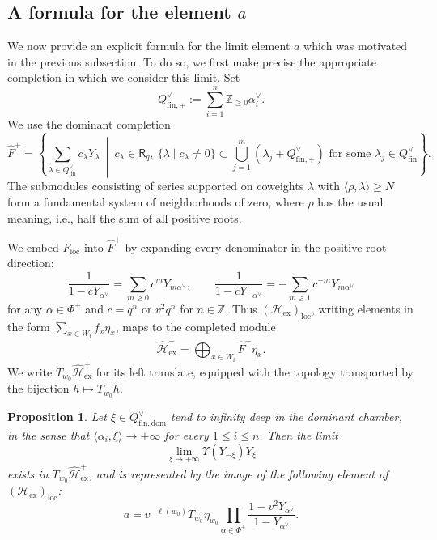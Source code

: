 \documentclass{amsart}
\newcommand{\Ring}{\mathsf{R}}
\newtheorem{Prop}[Thm]{Proposition}
\theoremstyle{definition}
\numberwithin{equation}{section}
\begin{document}
\subsection{A formula for the element $a$}\label{sec:levelzero-a-new}

We now provide an explicit formula for the limit element $a$ which was motivated in the previous subsection. To do so, we first make precise the appropriate completion in which we consider this limit. Set
\[
Q_{\mathrm{fin},+}^\vee:=\sum_{i=1}^n\mathbb Z_{\geqslant 0}\alpha_i^\vee.
\]
We use the dominant completion
\[
\widehat F^{+}
=
\left\{
\sum_{\lambda\in Q_{\mathrm{fin}}^\vee} c_\lambda Y_\lambda\ \middle|\
c_\lambda\in\Ring_q,\
\{\lambda\mid c_\lambda\neq 0\}\subset
\bigcup_{j=1}^m(\lambda_j+Q_{\mathrm{fin},+}^\vee)\text{ for some }\lambda_j\in Q_{\mathrm{fin}}^\vee
\right\}.
\]
The submodules
consisting of series supported on coweights \(\lambda\) with
\(\langle\rho,\lambda\rangle\geqslant N\) form a fundamental system of
neighborhoods of zero, where $\rho$ has the usual meaning, i.e., half the sum of all positive roots.

We embed \(F_{\mathrm{loc}}\) into \(\widehat F^{+}\) by expanding every
denominator in the positive root direction:
\[
\frac{1}{1-cY_{\alpha^\vee}}=\sum_{m\geqslant 0}c^mY_{m\alpha^\vee},
\qquad
\frac{1}{1-cY_{-\alpha^\vee}}=-\sum_{m\geqslant 1}c^{-m}Y_{m\alpha^\vee}
\]
for any $\alpha\in\Phi^+$ and $c = q^n$ or $v^2q^n$ for $n \in \mathbb{Z}$.
Thus \((\mathcal H_{\mathrm{ex}})_{\mathrm{loc}}\), writing elements in the form \(\sum_{x\in W_{\mathrm f}}f_x\eta_x\), maps to the completed
module
\[
\widehat{\mathcal H}_{\mathrm{ex}}^{+}
=
\bigoplus_{x\in W_{\mathrm f}}\widehat F^{+}\eta_x.
\]
We write \(T_{w_0}\widehat{\mathcal H}_{\mathrm{ex}}^+\) for its left
translate, equipped with the topology transported by the bijection
\(h\mapsto T_{w_0}h\).

\begin{Prop}\label{prop:a-limit-formula}
Let \(\xi\in Q_{\mathrm{fin,dom}}^\vee\) tend to infinity deep in the
dominant chamber, in the sense that
\(\langle\alpha_i,\xi\rangle\to+\infty\) for every \(1\leqslant i\leqslant n\).
Then the limit
\[
\lim_{\xi\to+\infty}\Upsilon(Y_{-\xi})Y_\xi
\]
exists in \(T_{w_0}\widehat{\mathcal H}_{\mathrm{ex}}^{+}\), and is represented
by the image of the following element of
\((\mathcal H_{\mathrm{ex}})_{\mathrm{loc}}\):
\[
a = v^{-\ell(w_0)}T_{w_0}\eta_{w_0}
\prod_{\alpha\in\Phi^+}
\frac{1-v^2Y_{\alpha^\vee}}{1-Y_{\alpha^\vee}}.
\]
\end{Prop}
\end{document}
